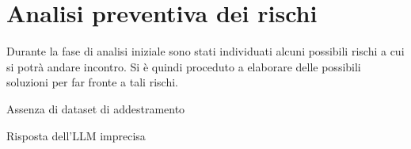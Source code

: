 \section{Analisi preventiva dei rischi}

Durante la fase di analisi iniziale sono stati individuati alcuni possibili rischi a cui si potrà andare incontro.
Si è quindi proceduto a elaborare delle possibili soluzioni per far fronte a tali rischi.\\

\begin{risk}{Assenza di dataset di addestramento}
    \label{risk:dataset-absence} 
\end{risk}

\begin{risk}{Risposta dell'LLM imprecisa}
    \label{risk:bad-llm-response} 
\end{risk}
